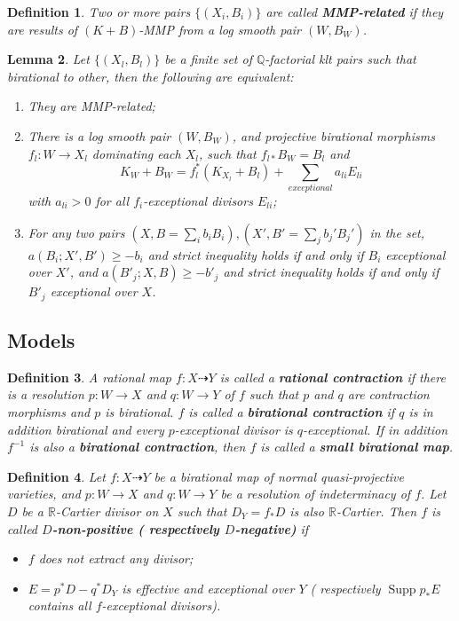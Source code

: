 \documentclass[11pt]{amsart}
\newtheorem{defn}{Definition}[section]
\newtheorem{lem}[defn]{Lemma}
\begin{document}
\begin{defn}
  \cite[Definition 3.3]{brunoLogSarkisovProgram1995}
  Two or more pairs $ \{(X_i,B_i)\} $ are called \textbf{MMP-related} if they are results of $ (K+B) $-MMP from a log smooth pair $(W,B_{W})$.
\end{defn}
 \begin{lem}\label{MMPrelatedConditation}
  \cite[Proposition 3.4]{brunoLogSarkisovProgram1995}
  Let $ \{(X_l,B_l)\} $ be a finite set of $ \mathbb{Q} $-factorial klt pairs such that birational to other, then the following are equivalent:
  \begin{enumerate}
    \item They are MMP-related;
    \item There is a log smooth pair $ (W,B_W) $, and projective birational morphisms $ f_l:W\to  X_l $ dominating each $ X_l $, such that $ f_{l*}B_W=B_l $ and
      \[ K_W+B_W=f_l^*(K_{X_l}+B_l)+\sum_{exceptional}{a_{li}E_{li}} \]
      with $ a_{li}>0 $ for all $ f_i $-exceptional divisors $E_{li}$;
    \item For any two pairs $ (X,B=\sum_ib_iB_i),(X',B'=\sum _jb_j'B_j') $ in the set,  $ a(B_i;X',B')\geqslant -b_i $ and strict inequality holds if and only if $ B_i $ exceptional over $ X' $, and $ a(B'_j;X,B)\geqslant -b'_j $ and strict inequality holds if and only if $ B'_j $ exceptional over $ X $.
  \end{enumerate}
\end{lem}


\subsection{Models}
\begin{defn}
  \cite[\S 2]{haconSarkisovProgram2012} A rational map $f:X\dashrightarrow Y$ is called a \textbf{rational contraction} if there is a resolution $p:W\to X$  and $q:W\to Y$  of $f$  such that $p$  and $q$  are contraction morphisms and $p$  is birational. $f$ is called a \textbf{birational contraction} if $q$  is in addition birational and every $p$-exceptional divisor is $q$-exceptional. If in addition $f^{-1}$ is also a \textbf{birational contraction}, then $f$ is called a \textbf{small birational map}.
\end{defn}

\begin{defn}\label{negativemap}
  \cite[Definition 3.6.1]{BCHM10} Let $f:X\dashrightarrow Y$ be a birational map of normal quasi-projective varieties, and $p:W\to X$ and $q:W\to Y$ be a resolution of indeterminacy of $f$. Let $D$ be a $\mathbb{R}$-Cartier divisor on $X$ such that  $D_{Y}=f_*D$ is  also $\mathbb{R}$-Cartier. Then $f$ is called \textbf{$D$-non-positive ( respectively $D$-negative)} if
\begin{itemize}
  \item $f$ does not extract any divisor;
  \item $E=p^{*}D-q^*D_Y$ is effective and exceptional over $Y$ ( respectively $\operatorname{Supp}p_*E$ contains all $f$-exceptional divisors).
\end{itemize}
\end{defn}
\end{document}
